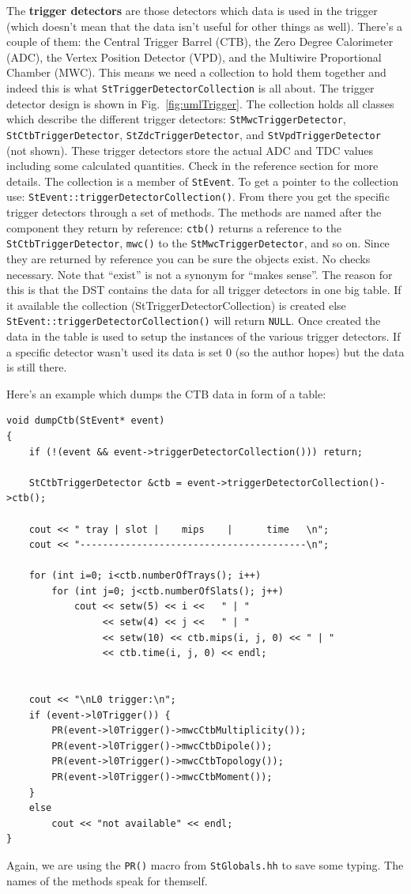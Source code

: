 \documentclass[twoside]{article}
\begin{document}
The \textbf{trigger detectors} are those detectors which data is used
in the trigger (which doesn't mean that the data isn't useful for
other things as well). There's a couple of them: the Central Trigger
Barrel (CTB), the Zero Degree Calorimeter (ADC), the Vertex Position
Detector (VPD), and the Multiwire Proportional Chamber (MWC). This
means we need a collection to hold them together and indeed this is
what \texttt{StTriggerDetectorCollection} is all about. The trigger
detector design is shown in Fig.~\ref{fig:umlTrigger}.  The collection
holds all classes which describe the different trigger detectors:
\texttt{StMwcTriggerDetector}, \texttt{StCtbTriggerDetector},
\texttt{StZdcTriggerDetector}, and \texttt{StVpdTriggerDetector} (not
shown).  These trigger detectors store the actual ADC and TDC values
including some calculated quantities. Check in the reference section
for more details.  The collection is a member of \texttt{StEvent}. To
get a pointer to the collection use:
\texttt{StEvent::triggerDetectorCollection()}. From there you get the
specific trigger detectors through a set of methods.  The methods are
named after the component they return by reference: \texttt{ctb()}
returns a reference to the \texttt{StCtbTriggerDetector},
\texttt{mwc()} to the \texttt{StMwcTriggerDetector}, and so on.  Since
they are returned by reference you can be sure the objects exist. No
checks necessary. Note that ``exist'' is not a synonym for ``makes
sense''. The reason for this is that the DST contains the data for all
trigger detectors in one big table. If it available the collection
(StTriggerDetectorCollection) is created else
\texttt{StEvent::triggerDetectorCollection()} will return
\texttt{NULL}.  Once created the data in the table is used to setup
the instances of the various trigger detectors. If a specific detector
wasn't used its data is set 0 (so the author hopes) but the data is
still there.

Here's an example which dumps the CTB data in form of a table:
\begin{verbatim}
void dumpCtb(StEvent* event)
{
    if (!(event && event->triggerDetectorCollection())) return;

    StCtbTriggerDetector &ctb = event->triggerDetectorCollection()->ctb();

    cout << " tray | slot |    mips    |      time   \n";
    cout << "----------------------------------------\n";

    for (int i=0; i<ctb.numberOfTrays(); i++) 
        for (int j=0; j<ctb.numberOfSlats(); j++) 
            cout << setw(5) << i <<   " | "
                 << setw(4) << j <<   " | "
                 << setw(10) << ctb.mips(i, j, 0) << " | "
                 << ctb.time(i, j, 0) << endl;


    cout << "\nL0 trigger:\n";
    if (event->l0Trigger()) {
        PR(event->l0Trigger()->mwcCtbMultiplicity());
        PR(event->l0Trigger()->mwcCtbDipole());
        PR(event->l0Trigger()->mwcCtbTopology());
        PR(event->l0Trigger()->mwcCtbMoment());
    }
    else
        cout << "not available" << endl;
}
\end{verbatim}
Again, we are using the \texttt{PR()} macro from \texttt{StGlobals.hh}
to save some typing. The names of the methods speak for themself.
\end{document}
